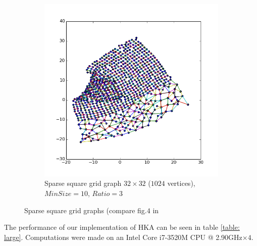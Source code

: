 \documentclass[12pt,a4paper]{article}
\begin{document}
\begin{figure}[htb]
\begin{subfigure}{0.5\textwidth}
           \includegraphics[scale=0.45]{results_Harel/HK_sgrid32x32_m10_r3.png}
            \caption{Sparse square grid graph $32\times 32$ ($1024$ vertices), $MinSize=10$, $Ratio=3$}
     \end{subfigure}
     \caption{Sparse square grid graphs (compare fig.$4$ in \cite{DavidHarel2002}}
     \label{fig: sgrid}
\end{figure}     

\newpage

The performance of our implementation of HKA can be seen in table \ref{table: large}. Computations were made on an Intel Core i7-3520M CPU @ 2.90GHz$\times 4$.
\end{document}
